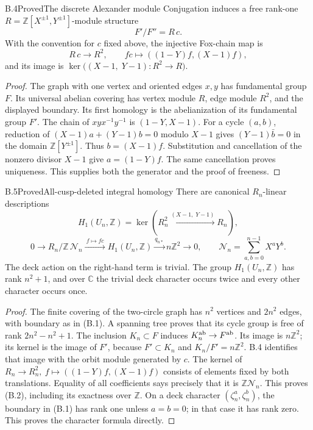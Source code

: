 \begin{statement}{B.4}{Proved}{The discrete Alexander module}
Conjugation induces a free rank-one
\(R=\mathbb Z[X^{\pm1},Y^{\pm1}]\)-module structure
\[
 F'/F''=R\,c.
\]
With the convention for \(c\) fixed above, the injective Fox-chain map is
\[
 R\,c\longrightarrow R^2,\qquad
 f c\longmapsto ((1-Y)f,(X-1)f),
\]
and its image is
\(\ker\bigl((X-1,\;Y-1):R^2\to R\bigr)\).
\end{statement}
\begin{proof}
The graph with one vertex and oriented edges \(x,y\) has fundamental
group \(F\). Its universal abelian covering has vertex module \(R\),
edge module \(R^2\), and the displayed boundary. Its first homology is
the abelianization of its fundamental group \(F'\). The chain of
\(xyx^{-1}y^{-1}\) is \((1-Y,X-1)\).
For a cycle \((a,b)\), reduction of
\((X-1)a+(Y-1)b=0\) modulo \(X-1\) gives
\((Y-1)\bar b=0\) in the domain \(\mathbb Z[Y^{\pm1}]\).
Thus \(b=(X-1)f\). Substitution and cancellation of the nonzero
divisor \(X-1\) give \(a=(1-Y)f\). The same cancellation proves
uniqueness. This supplies both the generator and the proof of freeness.
\end{proof}

\begin{statement}{B.5}{Proved}{All-cusp-deleted integral homology}
There are canonical \(R_n\)-linear descriptions
\[
 H_1(U_n,\mathbb Z)=
 \ker\left(R_n^2\xrightarrow{(X-1,\;Y-1)}R_n\right),             \tag{B.1}
\]
\[
 0\longrightarrow
 R_n/\mathbb Z\,\mathcal N_n
 \xrightarrow{\ f\mapsto f c\ }H_1(U_n,\mathbb Z)
 \xrightarrow{q_{n*}} n\mathbb Z^2\longrightarrow0,\qquad
 \mathcal N_n=\sum_{a,b=0}^{n-1}X^aY^b.                       \tag{B.2}
\]
The deck action on the right-hand term is trivial.
The group \(H_1(U_n,\mathbb Z)\) has rank \(n^2+1\), and over
\(\mathbb C\) the trivial deck character occurs twice and every other
character occurs once.
\end{statement}
\begin{proof}
The finite covering of the two-circle graph has \(n^2\) vertices and
\(2n^2\) edges, with boundary as in (B.1). A spanning tree proves that
its cycle group is free of rank \(2n^2-n^2+1\).
The inclusion \(K_n\subset F\) induces \(K_n^{\rm ab}\to F^{\rm ab}\).
Its image is \(n\mathbb Z^2\); its kernel is the image of \(F'\),
because \(F'\subset K_n\) and \(K_n/F'=n\mathbb Z^2\).
B.4 identifies that image with the orbit module generated by \(c\).
The kernel of \(R_n\to R_n^2,\ f\mapsto ((1-Y)f,(X-1)f)\)
consists of elements fixed by both translations. Equality of all
coefficients says precisely that it is \(\mathbb Z\mathcal N_n\).
This proves (B.2), including its exactness over \(\mathbb Z\).
On a deck character \((\zeta_n^a,\zeta_n^b)\), the boundary in
(B.1) has rank one unless \(a=b=0\); in that case it has rank zero.
This proves the character formula directly.
\end{proof}

